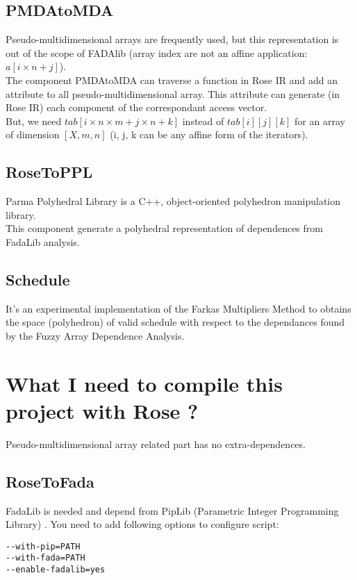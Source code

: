 		\subsection{PMDAtoMDA}
	
	Pseudo-multidimensional arrays are frequently used, but this representation is out of the scope of FADAlib
(array index are not an affine application: $a[i \times n + j]$).\\

	The component PMDAtoMDA can traverse a function in Rose IR and add an attribute to all pseudo-multidimensional
array. This attribute can generate (in Rose IR) each component of the correspondant access vector.\\
	But, we need $tab[i \times n \times m + j \times n + k]$ instead of 
$tab[i][j][k]$ for an array of dimension $[X, m, n]$ (i, j, k can be any affine form of the iterators).
	
		\subsection{RoseToPPL}
		
	Parma Polyhedral Library \cite{PPL} is a C++, object-oriented polyhedron manipulation library.\\
	This component generate a polyhedral representation of dependences from FadaLib analysis.
	
		\subsection{Schedule}
		
	It's an experimental implementation of the Farkas Multipliers Method to obtains the space (polyhedron) of 
valid schedule with respect to the dependances found by the Fuzzy Array Dependence Analysis.

	\section{What I need to compile this project with Rose ?}
	\label{polyhedric:getstarted}

	Pseudo-multidimensional array related part has no extra-dependences.
	
		\subsection{RoseToFada}
	
	FadaLib \cite{FADAweb} is needed and depend from PipLib (Parametric Integer Programming Library)
\cite{PIP}.
	You need to add following options to configure script:
\begin{verbatim}
--with-pip=PATH
--with-fada=PATH
--enable-fadalib=yes
\end{verbatim}
	
